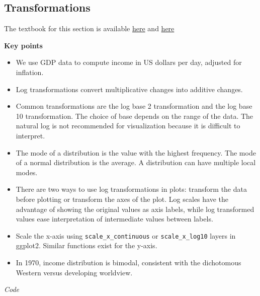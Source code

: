 \documentclass[
]{article}
\providecommand{\tightlist}{%
  \setlength{\itemsep}{0pt}\setlength{\parskip}{0pt}}
\begin{document}
\hypertarget{transformations}{%
\subsection{Transformations}\label{transformations}}

The textbook for this section is available
\href{https://rafalab.github.io/dsbook/gapminder.html\#data-transformations}{here}
and
\href{https://rafalab.github.io/dsbook/gapminder.html\#visualizing-multimodal-distributions}{here}

\textbf{Key points}

\begin{itemize}
\tightlist
\item
  We use GDP data to compute income in US dollars per day, adjusted for
  inflation.
\item
  Log transformations convert multiplicative changes into additive
  changes.
\item
  Common transformations are the log base 2 transformation and the log
  base 10 transformation. The choice of base depends on the range of the
  data. The natural log is not recommended for visualization because it
  is difficult to interpret.
\item
  The mode of a distribution is the value with the highest frequency.
  The mode of a normal distribution is the average. A distribution can
  have multiple local modes.
\item
  There are two ways to use log transformations in plots: transform the
  data before plotting or transform the axes of the plot. Log scales
  have the advantage of showing the original values as axis labels,
  while log transformed values ease interpretation of intermediate
  values between labels.
\item
  Scale the x-axis using \texttt{scale\_x\_continuous} or
  \texttt{scale\_x\_log10} layers in ggplot2. Similar functions exist
  for the y-axis.
\item
  In 1970, income distribution is bimodal, consistent with the
  dichotomous Western versus developing worldview.
\end{itemize}

\emph{Code}
\end{document}
